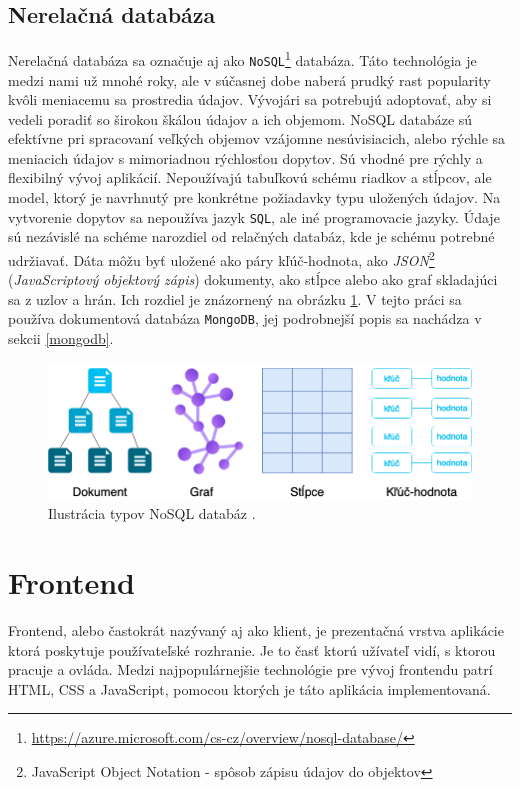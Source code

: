 \subsection{Nerelačná databáza}
Nerelačná databáza sa označuje aj ako \texttt{NoSQL}\footnote{\url{https://azure.microsoft.com/cs-cz/overview/nosql-database/}} databáza. Táto technológia je medzi nami už mnohé roky, ale v súčasnej dobe naberá prudký rast popularity kvôli meniacemu sa prostredia údajov. Vývojári sa potrebujú adoptovať, aby si vedeli poradiť so širokou škálou údajov a ich objemom. NoSQL databáze sú efektívne pri spracovaní veľkých objemov vzájomne nesúvisiacich, alebo rýchle sa meniacich údajov s mimoriadnou rýchlosťou dopytov\cite{nosql}. Sú vhodné pre rýchly a flexibilný vývoj aplikácií. Nepoužívajú tabuľkovú schému riadkov a stĺpcov, ale model, ktorý je navrhnutý pre konkrétne požiadavky typu uložených údajov. Na vytvorenie dopytov sa nepoužíva jazyk \texttt{SQL}, ale iné programovacie jazyky. Údaje sú nezávislé na schéme narozdiel od relačných databáz, kde je schému potrebné udržiavať. Dáta môžu byť uložené ako páry kľúč-hodnota, ako \textit{JSON}\footnote{JavaScript Object Notation - spôsob zápisu údajov do objektov} (\textit{JavaScriptový objektový zápis}) dokumenty, ako stĺpce alebo ako graf skladajúci sa z uzlov a hrán. Ich rozdiel je znázornený na obrázku \ref{pic:nosql_types}. V tejto práci sa používa dokumentová databáza \texttt{MongoDB}, jej podrobnejší popis sa nachádza v sekcii \ref{mongodb}.

    \begin{figure}[!hbt]
        \centering
        \includegraphics[scale=0.45]{obrazky/nosql_types.png}
        \caption{Ilustrácia typov NoSQL databáz \cite{nosql}.}
        \label{pic:nosql_types}
    \end{figure}

\section{Frontend}
Frontend, alebo častokrát nazývaný aj ako klient, je prezentačná vrstva aplikácie ktorá poskytuje používateľské rozhranie. Je to časť ktorú užívateľ vidí, s ktorou pracuje a ovláda. Medzi najpopulárnejšie technológie pre vývoj frontendu patrí HTML, CSS a JavaScript, pomocou ktorých je táto aplikácia implementovaná. 

